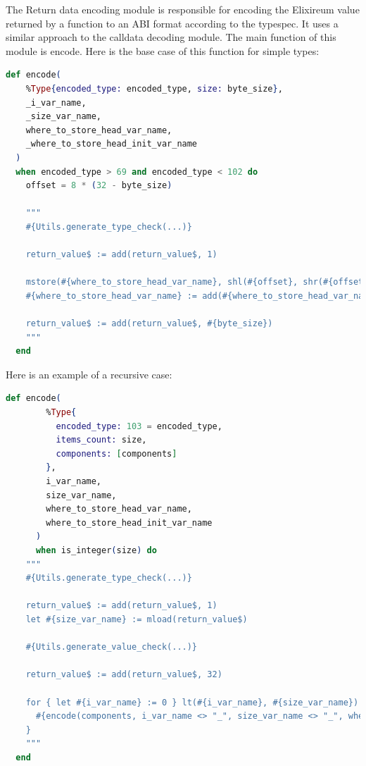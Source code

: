 The Return data encoding module is responsible for encoding the Elixireum value returned by a function to an ABI format according to the typespec. It uses a similar approach to the calldata decoding module. The main function of this module is encode. Here is the base case of this function for simple types:

\begin{lstlisting}[language=elixir, caption={Encode base case}, label={lst:encode_base_case}]
  def encode(
    %Type{encoded_type: encoded_type, size: byte_size},
    _i_var_name,
    _size_var_name,
    where_to_store_head_var_name,
    _where_to_store_head_init_var_name
  )
  when encoded_type > 69 and encoded_type < 102 do
    offset = 8 * (32 - byte_size)

    """
    #{Utils.generate_type_check(...)}

    return_value$ := add(return_value$, 1)

    mstore(#{where_to_store_head_var_name}, shl(#{offset}, shr(#{offset}, mload(return_value$))))
    #{where_to_store_head_var_name} := add(#{where_to_store_head_var_name}, 32)

    return_value$ := add(return_value$, #{byte_size})
    """
  end
\end{lstlisting}

Here is an example of a recursive case:

\begin{lstlisting}[language=elixir, caption={Encode recursive case}, label={lst:encode_recursive_case}]
  def encode(
        %Type{
          encoded_type: 103 = encoded_type,
          items_count: size,
          components: [components]
        },
        i_var_name,
        size_var_name,
        where_to_store_head_var_name,
        where_to_store_head_init_var_name
      )
      when is_integer(size) do
    """
    #{Utils.generate_type_check(...)}

    return_value$ := add(return_value$, 1)
    let #{size_var_name} := mload(return_value$)

    #{Utils.generate_value_check(...)}

    return_value$ := add(return_value$, 32)

    for { let #{i_var_name} := 0 } lt(#{i_var_name}, #{size_var_name}) { #{i_var_name} := add(#{i_var_name}, 1) } {
      #{encode(components, i_var_name <> "_", size_var_name <> "_", where_to_store_head_var_name, where_to_store_head_init_var_name)}
    }
    """
  end
\end{lstlisting}
    


